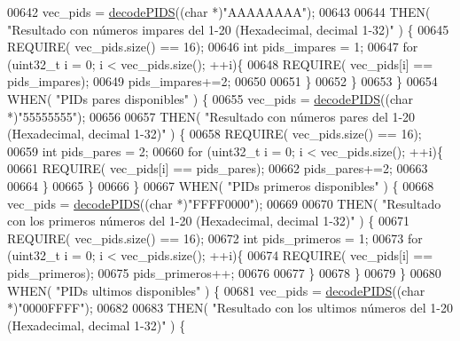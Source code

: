 \begin{DoxyCode}
{{{00642             vec\_pids = \hyperlink{decoders_8cpp_aef44cca306ed9c74b146d2b7dd058763}{decodePIDS}((\textcolor{keywordtype}{char} *)\textcolor{stringliteral}{"AAAAAAAA"});
00643 
00644             THEN( \textcolor{stringliteral}{"Resultado con números impares del 1-20 (Hexadecimal, decimal 1-32)"} ) \{
00645                 REQUIRE( vec\_pids.size() == 16);
00646                 \textcolor{keywordtype}{int} pids\_impares = 1;
00647                 \textcolor{keywordflow}{for} (uint32\_t i = 0; i < vec\_pids.size(); ++i)\{
00648                     REQUIRE( vec\_pids[i] == pids\_impares);
00649                     pids\_impares+=2;
00650 
00651                 \}
00652             \}
00653         \}
00654         WHEN( \textcolor{stringliteral}{"PIDs pares disponibles"} ) \{
00655             vec\_pids = \hyperlink{decoders_8cpp_aef44cca306ed9c74b146d2b7dd058763}{decodePIDS}((\textcolor{keywordtype}{char} *)\textcolor{stringliteral}{"55555555"});
00656 
00657             THEN( \textcolor{stringliteral}{"Resultado con números pares del 1-20 (Hexadecimal, decimal 1-32)"} ) \{
00658                 REQUIRE( vec\_pids.size() == 16);
00659                 \textcolor{keywordtype}{int} pids\_pares = 2;
00660                 \textcolor{keywordflow}{for} (uint32\_t i = 0; i < vec\_pids.size(); ++i)\{
00661                     REQUIRE( vec\_pids[i] == pids\_pares);
00662                     pids\_pares+=2;
00663 
00664                 \}
00665             \}
00666         \}
00667         WHEN( \textcolor{stringliteral}{"PIDs primeros disponibles"} ) \{
00668             vec\_pids = \hyperlink{decoders_8cpp_aef44cca306ed9c74b146d2b7dd058763}{decodePIDS}((\textcolor{keywordtype}{char} *)\textcolor{stringliteral}{"FFFF0000"});
00669 
00670             THEN( \textcolor{stringliteral}{"Resultado con los primeros números del 1-20 (Hexadecimal, decimal 1-32)"} ) \{
00671                 REQUIRE( vec\_pids.size() == 16);
00672                 \textcolor{keywordtype}{int} pids\_primeros = 1;
00673                 \textcolor{keywordflow}{for} (uint32\_t i = 0; i < vec\_pids.size(); ++i)\{
00674                     REQUIRE( vec\_pids[i] == pids\_primeros);
00675                     pids\_primeros++;
00676 
00677                 \}
00678             \}
00679         \}
00680         WHEN( \textcolor{stringliteral}{"PIDs ultimos disponibles"} ) \{
00681             vec\_pids = \hyperlink{decoders_8cpp_aef44cca306ed9c74b146d2b7dd058763}{decodePIDS}((\textcolor{keywordtype}{char} *)\textcolor{stringliteral}{"0000FFFF"});
00682 
00683             THEN( \textcolor{stringliteral}{"Resultado con los ultimos números del 1-20 (Hexadecimal, decimal 1-32)"} ) \{
}}}
\end{DoxyCode}
